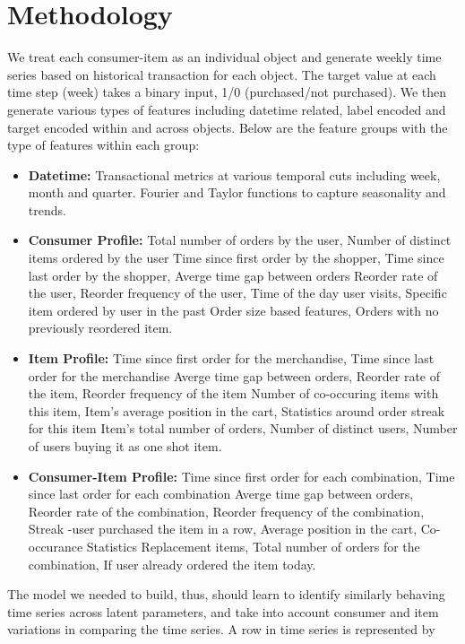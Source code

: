 \section{Methodology}
We treat each consumer-item as an individual object and generate weekly time series based on historical transaction for 
each object. The target value at each time step (week) takes a binary input, 1/0 (purchased/not purchased).
We then generate various types of features including datetime related, label encoded and target encoded 
within and across objects. Below are the feature groups with the type of features within each group:
\begin{itemize}
\item {\bf Datetime:} Transactional metrics at various temporal cuts including week, month and quarter. 
Fourier and Taylor functions to capture seasonality and trends.
\item {\bf Consumer Profile:} Total number of orders by the user, Number of distinct items ordered by the user
Time since first order by the shopper, Time since last order by the shopper, Averge time gap between orders
Reorder rate of the user, Reorder frequency of the user, Time of the day user visits, Specific item ordered by user in the past
Order size based features, Orders with no previously reordered item.
\item {\bf Item Profile:} Time since first order for the merchandise, Time since last order for the merchandise
Averge time gap between orders, Reorder rate of the item, Reorder frequency of the item
Number of co-occuring items with this item, Item's average position in the cart, Statistics around order streak for this item
Item's total number of orders, Number of distinct users, Number of users buying it as one shot item.
\item {\bf Consumer-Item Profile:} Time since first order for each combination, Time since last order for each combination
Averge time gap between orders, Reorder rate of the combination, Reorder frequency of the combination, 
Streak -user purchased the item in a row, Average position in the cart, Co-occurance Statistics
Replacement items, Total number of orders for the combination, If user already ordered the item today.
\end{itemize}
The model we needed to build, thus, should learn to identify similarly behaving time series across latent
parameters, and take into account consumer and item variations in comparing the time series. A row in time series 
is represented by

